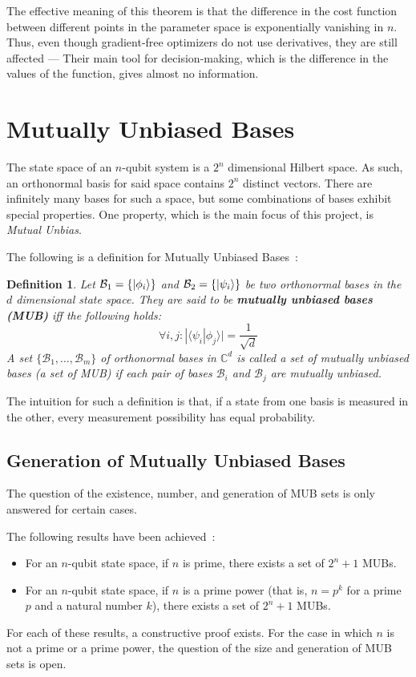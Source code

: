 \documentclass[a4paper,12pt]{article}
\newcommand{\base}{\mathcal{B}}
\newtheorem{definition}{Definition}
\begin{document}
The effective meaning of this theorem is that the difference in the cost function between different points in the parameter space is exponentially vanishing in $n$.
Thus, even though gradient-free optimizers do not use derivatives, they are still affected --- Their main tool for decision-making, which is the difference in the values of the function, gives almost no information.

\section{Mutually Unbiased Bases}
The state space of an $n$-qubit system is a $2^n$ dimensional Hilbert space.
As such, an orthonormal basis for said space contains $2^n$ distinct vectors.
There are infinitely many bases for such a space, but some combinations of bases exhibit special properties. One property, which is the main focus of this project, is \emph{Mutual Unbias}.

The following is a definition for Mutually Unbiased Bases~\cite{bandyopadhyay_new_2002}:
\begin{definition}
    Let $\base_1 = \{\ket{\phi_i}\}$ and $\base_2 = \{\ket{\psi_i}\}$ be two orthonormal bases in the $d$ dimensional state space.
    They are said to be \textbf{mutually unbiased bases (MUB)} iff the following holds:
    \begin{equation}
        \forall i,j : |\langle \psi_i | \phi_j \rangle | = \frac{1}{\sqrt{d}}
    \end{equation}
    A set $\{\base_1,\dots,\base_m\}$ of orthonormal bases in $\mathbb{C}^d$ is called a \emph{set of mutually unbiased bases} (a set of MUB) if each pair of bases $\base_i$ and $\base_j$ are mutually unbiased.
\end{definition}

The intuition for such a definition is that, if a state from one basis is measured in the other, every measurement possibility has equal probability.

\subsection{Generation of Mutually Unbiased Bases}
The question of the existence, number, and generation of MUB sets is only answered for certain cases.

The following results have been achieved~\cite{bandyopadhyay_new_2002}:
\begin{itemize}
    \item For an $n$-qubit state space, if $n$ is prime, there exists a set of $2^n+1$ MUBs.
    \item For an $n$-qubit state space, if $n$ is a prime power (that is, $n = p^k$ for a prime $p$ and a natural number $k$), there exists a set of $2^n+1$ MUBs.
\end{itemize}
For each of these results, a constructive proof exists.
For the case in which $n$ is not a prime or a prime power, the question of the size and generation of MUB sets is open.
\end{document}
